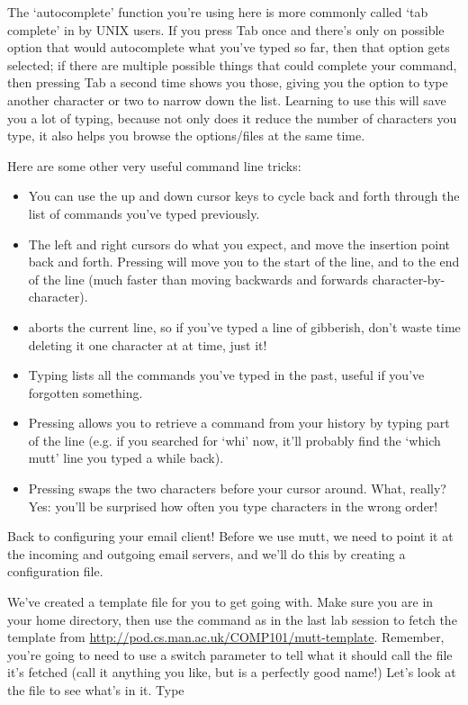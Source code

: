 The `autocomplete' function you're using here is more commonly called `tab complete' in by UNIX users. If you press Tab once and there's only on possible option that would autocomplete what you've typed so far, then that option gets selected; if there are multiple possible things that could complete your command, then pressing Tab a second time shows you those, giving you the option to type another character or two to narrow down the list. Learning to use this will save you a lot of typing, because not only does it reduce the number of characters you type, it also helps you browse the options/files at the same time. 

Here are some other very useful command line tricks:

\begin{itemize}
\item You can use the up and down cursor keys to cycle back and forth through the list of commands you've typed previously.
\item The left and right cursors do what you expect, and move the insertion point back and forth. Pressing  will move you to the start of the line, and  to the end of the line (much faster than moving backwards and forwards character-by-character). 
\item {} aborts the current line, so if you've typed a line of gibberish, don't waste time deleting it one character at at time, just  it!
\item Typing  lists all the commands you've typed in the past, useful if you've forgotten something.
\item Pressing  allows you to retrieve a command from your history by typing part of the line (e.g. if you searched for `whi' now, it'll probably find the `which mutt' line you typed a while back). 
\item Pressing  swaps the two characters before your cursor around. What, really? Yes: you'll be surprised how often you type characters in the wrong order! 
\end{itemize}

Back to configuring your email client! Before we use mutt, we need to point it at the incoming and outgoing email servers, and we'll do this by creating a configuration file.

We've created a template file for you to get going with. Make sure you are in your home directory, then use the  command as in the last lab session to fetch the template from \url{http://pod.cs.man.ac.uk/COMP101/mutt-template}. Remember, you're going to need to use a switch parameter to tell  what it should call the file it's fetched (call it anything you like, but  is a perfectly good name!) Let's look at the file to see what's in it. Type

